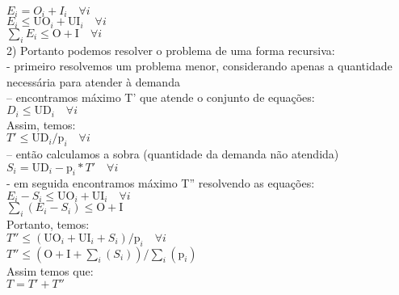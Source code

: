 \documentclass{book}
\begin{document}
$E_i = O_i + I_i \quad \forall i $ \\

$E_i \leq \textrm{UO}_i + \textrm{UI}_i \quad \forall i$ \\

$\sum_i{E_i} \leq \textrm{O} + \textrm{I} \quad \forall i$ \\

2) Portanto podemos resolver o problema de uma forma recursiva: \\

 - primeiro resolvemos um problema menor, considerando apenas a quantidade necessária para atender à demanda \\
 
 		-- encontramos máximo T' que atende o conjunto de equações: \\
 		
 		$D_i \leq \textrm{UD}_i \quad \forall i$ \\
 		
 		Assim, temos: \\
 		
 		$ T' \leq \textrm{UD}_i/\textrm{p}_i \quad \forall i$ \\
 		
 		-- então calculamos a sobra (quantidade da demanda não atendida) \\
 		
 		$S_i = \textrm{UD}_i - \textrm{p}_i * T' \quad \forall i$ \\
 
 - em seguida encontramos máximo T'' resolvendo as equações: \\
 
$E_i - S_i \leq \textrm{UO}_i + \textrm{UI}_i \quad \forall i$ \\

$\sum_i{(E_i- S_i)} \leq \textrm{O} + \textrm{I}$ \\

Portanto, temos: \\
 
$T'' \leq (\textrm{UO}_i + \textrm{UI}_i + S_i) / \textrm{p}_i  \quad \forall i$ \\

$T'' \leq (\textrm{O} + \textrm{I} + \sum_i{(S_i)}) / \sum_i{(\textrm{p}_i)}$ \\

Assim temos que: \\

$T = T' + T''$ \\
\end{document}
